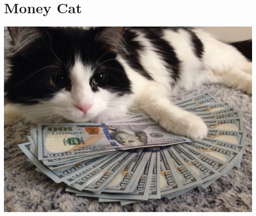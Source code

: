 \documentclass[../mainfile.tex]{subfiles}
\begin{document}
\section{Money Cat}
\includegraphics[scale=0.5]{./mkisser/img/image.png}
\end{document}
